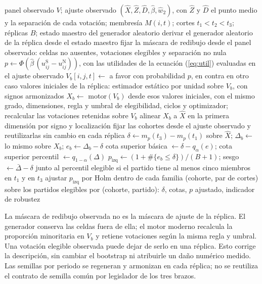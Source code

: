\begin{algorithm}[htbp]
\caption{Bootstrap paramétrico de medianas de partido.}
\label{alg:bootstrap}
\small
\begin{algorithmic}[1]
\Require panel observado $V$; ajuste observado $(\hat X, \hat Z, \hat D, \hat\beta, \hat w_2)$, con $\hat Z$ y $\hat D$ el punto medio y la separación de cada votación; membresía $M(i,t)$; cortes $t_1 < t_2 < t_3$; réplicas $B$; estado maestro del generador aleatorio
  \State derivar el generador aleatorio de la réplica desde el estado maestro
  \State fijar la máscara de redibujo desde el panel observado: celdas no ausentes, votaciones elegibles y separación no nula
    \State $p \gets \Phi\!\left(\hat\beta\,(u^{\mathrm{S}}_{ij} - u^{\mathrm{N}}_{ij})\right)$, con las utilidades de la ecuación (\ref{eq:util}) evaluadas en el ajuste observado
    \State $V_b[i,j,t] \gets$ a favor con probabilidad $p$, en contra en otro caso
  \EndFor
  \State valores iniciales de la réplica: estimador estático por unidad sobre $V_b$, con signos armonizados
  \State $X_b \gets$ motor$(V_b)$ desde esos valores iniciales, con el mismo grado, dimensiones, regla y umbral de elegibilidad, ciclos y optimizador; recalcular las votaciones retenidas sobre $V_b$
  \State alinear $X_b$ a $\hat X$ en la primera dimensión por signo y localización
\EndFor
\State fijar las cohortes desde el ajuste observado y reutilizarlas sin cambio en cada réplica
  \State $\delta \gets m_p(t_3) - m_p(t_1)$ sobre $\hat X$; \quad $\Delta_b \gets$ lo mismo sobre $X_b$; \quad $e_b \gets \Delta_b - \delta$
  \State cota superior básica $\gets \delta - q_\alpha(e)$; \quad cota superior percentil $\gets q_{1-\alpha}(\Delta)$
  \State $p_{\mathrm{izq}} \gets (1 + \#\{e_b \le \delta\})/(B+1)$; sesgo $\gets \bar\Delta - \delta$ junto al percentil
  \State elegible si el partido tiene al menos cinco miembros en $t_1$ y en $t_3$
\EndFor
\State ajustar $p_{\mathrm{izq}}$ por Holm dentro de cada familia (cohorte, par de cortes) sobre los partidos elegibles
\State \Return por (cohorte, partido): $\delta$, cotas, $p$ ajustado, indicador de robustez
\end{algorithmic}
\end{algorithm}

La máscara de redibujo observada no es la máscara de ajuste de la réplica. El generador
conserva las celdas fuera de ella; el motor moderno recalcula la proporción minoritaria en
$V_b$ y retiene votaciones según la misma regla y umbral. Una votación elegible observada puede
dejar de serlo en una réplica. Esto corrige la descripción, sin cambiar el bootstrap ni
atribuirle un daño numérico medido. Las semillas por periodo se regeneran y armonizan en cada
réplica; no se reutiliza el contrato de semilla común por legislador de los tres brazos.

